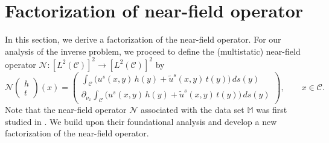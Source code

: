 \documentclass{article}
\begin{document}
\section{Factorization of near-field operator}\label{NF_operator_sect}
In this section, we derive a factorization of the near-field operator. For our analysis of the inverse problem, we proceed to define the (multistatic) near-field operator $\mathcal N : [L^2(\mathcal C)]^2\to [L^2(\mathcal C)]^2$ by
\begin{equation}\label{NF_operator}
\mathcal N
\begin{pmatrix}
h\\
t
\end{pmatrix}(x)
=
\begin{pmatrix}
\displaystyle
\int_{\mathcal C}
\big(u^{s}(x,y)\,h(y) + \tilde u^{s}(x,y)\,t(y)\big)\,ds(y)
\\[2ex]
\displaystyle
\partial_{\nu_x}
\int_{\mathcal C}
\big(u^{s}(x,y)\,h(y) + \tilde u^{s}(x,y)\,t(y)\big)\,ds(y)
\end{pmatrix},
\qquad x \in \mathcal C.
\end{equation}
Note that the near-field operator $\mathcal{N}$ associated with the data set $\mathbb M$ was first studied in \cite{BourgeoisRecoquillay2020}. We build upon their foundational analysis and develop a new factorization of the near-field operator. 
\end{document}
